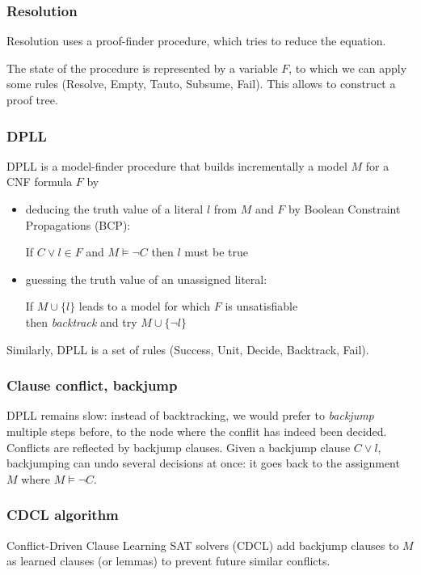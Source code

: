 \documentclass[toc, titlepaged]{../cs-classes/cs-classes}
\begin{document}
\subsubsection{Resolution}
Resolution uses a proof-finder procedure, which tries to reduce the equation.

The state of the procedure is represented by a variable $F$, to which we can apply some rules (Resolve, Empty, Tauto, Subsume, Fail). This allows to construct a proof tree.

\subsubsection{DPLL}
DPLL is a model-finder procedure that builds incrementally a model $M$ for a CNF formula $F$ by
\begin{itemize}
    \item deducing the truth value of a literal $l$ from $M$ and $F$ by Boolean Constraint Propagations (BCP):
    \begin{center}
        If $C\lor l\in F$ and $M\vDash \lnot C$ then $l$ must be true
    \end{center}
    \item guessing the truth value of an unassigned literal:
    \begin{center}
        If $M\cup\{l\}$ leads to a model for which $F$ is unsatisfiable\\ then \emph{backtrack} and try $M\cup\{\lnot l\}$
    \end{center}
\end{itemize}

Similarly, DPLL is a set of rules (Success, Unit, Decide, Backtrack, Fail).

\subsubsection{Clause conflict, backjump}
DPLL remains slow: instead of backtracking, we would prefer to \emph{backjump} multiple steps before, to the node where the conflit has indeed been decided. Conflicts are reflected by backjump clauses. Given a backjump clause $C\lor l$, backjumping can undo several decisions at once: it goes back to the assignment $M$ where $M \vDash \lnot C$.

\subsubsection{CDCL algorithm}
Conflict-Driven Clause Learning SAT solvers (CDCL) add backjump clauses to $M$ as learned clauses (or lemmas) to prevent future similar conflicts. 
\end{document}
